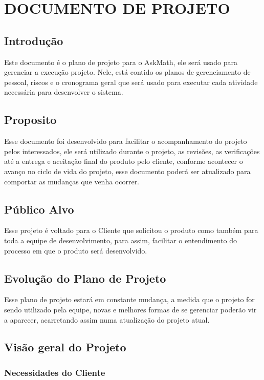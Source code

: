 \newpage
\chapter{DOCUMENTO DE PROJETO}\label{apendice_projeto}

\section{Introdução}
Este documento é o plano de projeto para o AskMath, ele será usado para 
gerenciar a execução projeto. Nele, está contido os planos de gerenciamento de 
pessoal, riscos e o cronograma geral que será usado para executar cada atividade 
necessária para desenvolver o sistema.

\section{Proposito}
Esse documento foi desenvolvido para facilitar o acompanhamento do projeto 
pelos interessados, ele será utilizado durante o projeto, as revisões, as 
verificações 
até a entrega e aceitação final do produto pelo cliente, conforme acontecer o 
avanço no ciclo de vida do projeto, esse documento poderá ser atualizado para 
comportar as mudanças que venha ocorrer.

\section{Público Alvo}
Esse projeto é voltado para o Cliente que solicitou o produto como também para 
toda a equipe de desenvolvimento, para assim, facilitar o entendimento do 
processo em que o produto será desenvolvido.

\section{Evolução do Plano de Projeto}
Esse plano de projeto estará em constante mudança, a medida que o projeto for 
sendo utilizado pela equipe, novas e melhores formas de se gerenciar poderão vir 
a aparecer, acarretando assim numa atualização do projeto atual.

\section{Visão geral do Projeto}
\subsection{Necessidades do Cliente}

